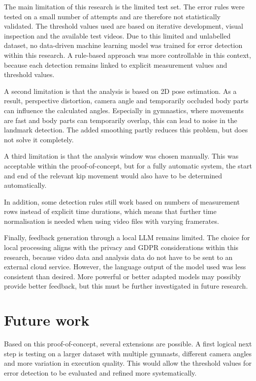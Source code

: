 The main limitation of this research is the limited test set. The error rules were tested on a small number of attempts and are therefore not statistically validated. The threshold values used are based on iterative development, visual inspection and the available test videos. Due to this limited and unlabelled dataset, no data-driven machine learning model was trained for error detection within this research. A rule-based approach was more controllable in this context, because each detection remains linked to explicit measurement values and threshold values.

A second limitation is that the analysis is based on 2D pose estimation. As a result, perspective distortion, camera angle and temporarily occluded body parts can influence the calculated angles. Especially in gymnastics, where movements are fast and body parts can temporarily overlap, this can lead to noise in the landmark detection. The added smoothing partly reduces this problem, but does not solve it completely.

A third limitation is that the analysis window was chosen manually. This was acceptable within the proof-of-concept, but for a fully automatic system, the start and end of the relevant kip movement would also have to be determined automatically.

In addition, some detection rules still work based on numbers of measurement rows instead of explicit time durations, which means that further time normalisation is needed when using video files with varying framerates.

Finally, feedback generation through a local LLM remains limited. The choice for local processing aligns with the privacy and GDPR considerations within this research, because video data and analysis data do not have to be sent to an external cloud service. However, the language output of the model used was less consistent than desired. More powerful or better adapted models may possibly provide better feedback, but this must be further investigated in future research.

\section{Future work}

Based on this proof-of-concept, several extensions are possible. A first logical next step is testing on a larger dataset with multiple gymnasts, different camera angles and more variation in execution quality. This would allow the threshold values for error detection to be evaluated and refined more systematically.

